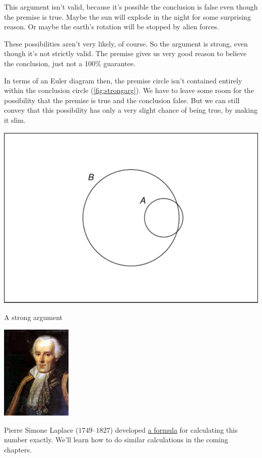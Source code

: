 \documentclass[justified]{tufte-book}
\theoremstyle{definition}
\theoremstyle{definition}
\theoremstyle{definition}
\theoremstyle{remark}
\begin{document}
This argument isn't valid, because it's possible the conclusion is false
even though the premise is true. Maybe the sun will explode in the night
for some surprising reason. Or maybe the earth's rotation will be
stopped by alien forces.

These possibilities aren't very likely, of course. So the argument is
strong, even though it's not strictly valid. The premise gives us very
good reason to believe the conclusion, just not a 100\% guarantee.

In terms of an Euler diagram then, the premise circle isn't contained
entirely within the conclusion circle (\ref{fig:strongarg}). We have to
leave some room for the possibility that the premise is true and the
conclusion false. But we can still convey that this possibility has only
a very slight chance of being true, by making it slim.

\begin{marginfigure}
\includegraphics{_main_files/figure-latex/strongarg-1} \caption[A strong argument]{A strong argument}\label{fig:strongarg}
\end{marginfigure}






\begin{marginfigure}
\includegraphics[width=1.33in]{img/laplace} \caption[Pierre Simone Laplace (\(1749\)--\(1827\)) developed
\href{https://bit.ly/2mU9WgW}{a formula} for calculating this number
exactly. We'll learn how to do similar calculations in the coming
chapters.]{Pierre Simone Laplace (\(1749\)--\(1827\)) developed
\href{https://bit.ly/2mU9WgW}{a formula} for calculating this number
exactly. We'll learn how to do similar calculations in the coming
chapters.}\label{fig:laplace}
\end{marginfigure}
\end{document}

